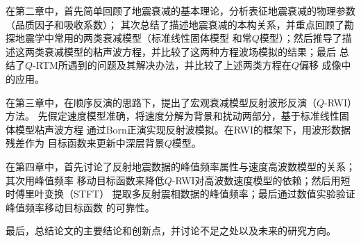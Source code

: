 在第二章中，首先简单回顾了地震衰减的基本理论，分析表征地震衰减的物理参数（品质因子和吸收系数）；
其次总结了描述地震衰减的本构关系，并重点回顾了勘探地震学中常用的两类衰减模型（标准线性固体模型
和常$Q$模型）；然后推导了描述这两类衰减模型的粘声波方程，并比较了这两种方程波场模拟的结果；最后
总结了$Q$-RTM所遇到的问题及其解决办法，并比较了上述两类方程在$Q$偏移
成像中的应用。

在第三章中，在顺序反演的思路下，提出了宏观衰减模型反射波形反演（$Q$-RWI）方法。
先假定速度模型准确，将速度分解为背景和扰动两部分，基于标准线性固体模型粘声波方程
通过Born正演实现反射波模拟。在RWI的框架下，用波形数据残差作为
目标函数来更新中深层背景$Q$模型。

在第四章中，首先讨论了反射地震数据的峰值频率属性与速度高波数模型的关系；其次用峰值频率
移动目标函数来降低$Q$-RWI对高波数速度模型的依赖；然后用短时傅里叶变换（STFT）
提取多反射震相数据的峰值频率；最后通过数值实验验证峰值频率移动目标函数
的可靠性。


最后，总结论文的主要结论和创新点，并讨论不足之处以及未来的研究方向。

















